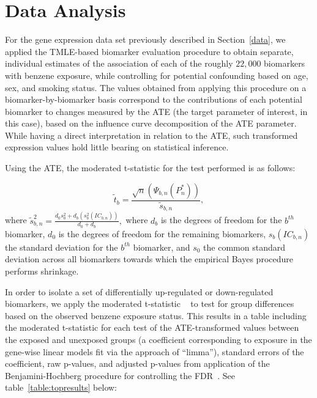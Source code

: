 \chapter{Data Analysis}

For the gene expression data set previously described in Section~\ref{data}, we
applied the TMLE-based biomarker evaluation procedure to obtain separate,
individual estimates of the association of each of the roughly $22,000$
biomarkers with benzene exposure, while controlling for potential confounding
based on age, sex, and smoking status. The values obtained from applying this
procedure on a biomarker-by-biomarker basis correspond to the contributions of
each potential biomarker to changes measured by the ATE (the target parameter of
interest, in this case), based on the influence curve decomposition of the ATE
parameter. While having a direct interpretation in relation to the ATE, such
transformed expression values hold little bearing on statistical inference.

Using the ATE, the moderated t-statistic for the test performed is as follows:

$$
\tilde{t}_b = \frac{\sqrt{n}(\Psi_{b,n}(P_n^*))}{\tilde{s}_{b,n}}
,$$
where $\tilde{s}_{b,n}^2=\frac{d_0s_0^2+d_b (s_b^2(IC_{b,n}))}{d_0+d_b},$ where
$d_b$ is the degrees of freedom for the $b^{th}$ biomarker, $d_0$ is the degrees
of freedom for the remaining biomarkers, $s_b(IC_{b,n})$ the standard deviation
for the $b^{th}$ biomarker, and $s_0$ the common standard deviation across all
biomarkers towards which the empirical Bayes procedure performs shrinkage.

In order to isolate a set of differentially up-regulated or down-regulated
biomarkers, we apply the moderated t-statistic ~\cite{smyth2004linear} to test
for group differences based on the observed benzene exposure status. This
results in a table including the moderated t-statistic for each test of the
ATE-transformed values between the exposed and unexposed groups (a coefficient
corresponding to exposure in the gene-wise linear models fit via the approach of
``limma''), standard errors of the coefficient, raw p-values, and adjusted
p-values from application of the Benjamini-Hochberg procedure for controlling
the FDR~\cite{benjamini1995controlling}. See table~\ref{table:topresults} below:

